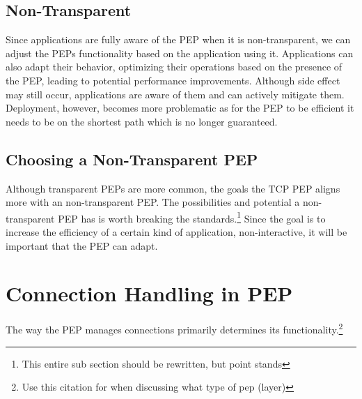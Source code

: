 \documentclass[a4paper,english, 11pt]{report}
\begin{document}
\subsection{Non-Transparent}
Since applications are fully aware of the PEP when it is non-transparent, we can adjust the PEPs functionality based on the application using it. Applications can also adapt their behavior, optimizing their operations based on the presence of the PEP, leading to potential performance improvements. Although side effect may still occur, applications are aware of them and can actively mitigate them.
Deployment, however, becomes more problematic as for the PEP to be efficient it needs to be on the shortest path which is no longer guaranteed.

\subsection{Choosing a Non-Transparent PEP}
Although transparent PEPs are more common, the goals the TCP PEP aligns more with an non-transparent PEP. The possibilities and potential a non-transparent PEP has is worth breaking the standards.\footnote{This entire sub section should be rewritten, but point stands}
Since the goal is to increase the efficiency of a certain kind of application, non-interactive, it will be important that the PEP can adapt.

\section{Connection Handling in PEP}
The way the PEP manages connections primarily determines its functionality.\cite{rfc3135_pep}\footnote{Use this citation for when discussing what type of pep (layer)}
\end{document}
